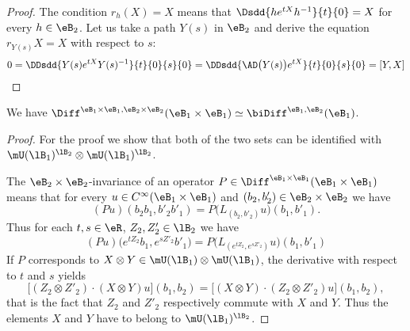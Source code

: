 \begin{proof}
	The condition $r_h(X)=X$ means that $\Dsdd{ h e^{tX}h^{-1} }{t}{0}=X$ for every $h\in\eB_2$. Let us take a path $Y(s)$ in $\eB_2$ and derive the equation $r_{Y(s)}X=X$ with respect to $s$:
	\begin{equation}
			0=\DDsdd{ Y(s) e^{tX}Y(s)^{-1} }{t}{0}{s}{0}=\DDsdd{ \AD\big( Y(s) \big) e^{tX} }{t}{0}{s}{0}=[Y,X]
	\end{equation}
\end{proof}

\begin{lemma}
	We have $\Diff^{\eB_1\times\eB_1,\eB_2\times\eB_2}(\eB_1\times\eB_1)\simeq\biDiff^{\eB_1,\eB_2}(\eB_1)$.
\end{lemma}

\begin{proof}
	For the proof we show that both of the two sets can be identified with $\mU(\lB_1)^{\lB_2}\otimes\mU(\lB_1)^{\lB_2}$.

	The $\eB_2\times\eB_2$-invariance of an operator $P\in\Diff^{\eB_1\times\eB_1}(\eB_1\times\eB_1)$ means that for every $u\in C^{\infty}(\eB_1\times\eB_1)$ and $(b_2,b'_2)\in\eB_2\times\eB_2$ we have
	\begin{equation}
		(Pu)(b_2b_1,b'_2b'_1)=P\big( L_{(b_2,b'_2)}u \big)(b_1,b'_1).
	\end{equation}
	Thus for each $t,s\in\eR$, $Z_2,Z'_2\in\lB_2$ we have
	\begin{equation}
		(Pu)\big(  e^{tZ_2}b_1, e^{sZ'_2}b'_1 \big)=P\big( L_{( e^{tZ_2}, e^{sZ'_2})}u \big)(b_1,b'_1)
	\end{equation}
	If $P$ corresponds to $X\otimes Y\in\mU(\lB_1)\otimes\mU(\lB_1)$, the derivative with respect to $t$ and $s$ yields
	\begin{equation}
		\big[ (Z_2\otimes Z'_2)\cdot(X\otimes Y)u \big](b_1,b_2)=\big[ (X\otimes Y)\cdot (Z_2\otimes Z'_2)u \big](b_1,b_2),
	\end{equation}
	that is the fact that $Z_2$ and $Z'_2$ respectively commute with $X$ and $Y$. Thus the elements $X$ and $Y$ have to belong to $\mU(\lB_1)^{\lB_2}$.


\end{proof}
